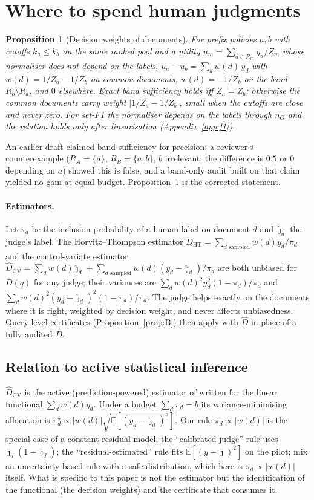 \documentclass{article}
\newtheorem{proposition}{Proposition}
\begin{document}
\section{Where to spend human judgments}\label{sec:where}
\begin{proposition}[Decision weights of documents]\label{prop:C}
For prefix policies $a,b$ with cutoffs $k_a\le k_b$ on the same ranked pool and a utility $u_m=\sum_{d\in R_m}y_d/Z_m$ whose normaliser does not depend on the labels, $u_a-u_b=\sum_d w(d)\,y_d$ with $w(d)=1/Z_a-1/Z_b$ on common documents, $w(d)=-1/Z_b$ on the band $R_b\setminus R_a$, and $0$ elsewhere. Exact band sufficiency holds iff $Z_a=Z_b$; otherwise the common documents carry weight $|1/Z_a-1/Z_b|$, small when the cutoffs are close and never zero. For set-F1 the normaliser depends on the labels through $n_G$ and the relation holds only after linearisation (Appendix~\ref{app:f1}).
\end{proposition}
An earlier draft claimed band sufficiency for precision; a reviewer's counterexample ($R_A=\{a\}$, $R_B=\{a,b\}$, $b$ irrelevant: the difference is $0.5$ or $0$ depending on $a$) showed this is false, and a band-only audit built on that claim yielded no gain at equal budget. Proposition~\ref{prop:C} is the corrected statement.

\paragraph{Estimators.} Let $\pi_d$ be the inclusion probability of a human label on document $d$ and $\hat\jmath_d$ the judge's label. The Horvitz--Thompson estimator $\hat D_{\mathrm{HT}}=\sum_{d\text{ sampled}}w(d)y_d/\pi_d$ and the control-variate estimator $\hat D_{\mathrm{CV}}=\sum_d w(d)\hat\jmath_d+\sum_{d\text{ sampled}}w(d)(y_d-\hat\jmath_d)/\pi_d$ are both unbiased for $D(q)$ for any judge; their variances are $\sum_d w(d)^2y_d^2(1-\pi_d)/\pi_d$ and $\sum_d w(d)^2(y_d-\hat\jmath_d)^2(1-\pi_d)/\pi_d$. The judge helps exactly on the documents where it is right, weighted by decision weight, and never affects unbiasedness. Query-level certificates (Proposition~\ref{prop:B}) then apply with $\hat D$ in place of a fully audited $D$.

\subsection{Relation to active statistical inference}\label{sec:relation}
$\hat D_{\mathrm{CV}}$ is the active (prediction-powered) estimator of \citet{zrnic2024active} written for the linear functional $\sum_d w(d)y_d$. Under a budget $\sum_d\pi_d=b$ its variance-minimising allocation is $\pi_d^\star\propto|w(d)|\sqrt{\mathbb E[(y_d-\hat\jmath_d)^2]}$. Our rule $\pi_d\propto|w(d)|$ is the special case of a constant residual model; the ``calibrated-judge'' rule uses $\hat\jmath_d(1-\hat\jmath_d)$; the ``residual-estimated'' rule fits $\mathbb E[(y-\hat\jmath)^2]$ on the pilot; \citet{li2025robust} mix an uncertainty-based rule with a safe distribution, which here is $\pi_d\propto|w(d)|$ itself. What is specific to this paper is not the estimator but the identification of the functional (the decision weights) and the certificate that consumes it.
\end{document}
